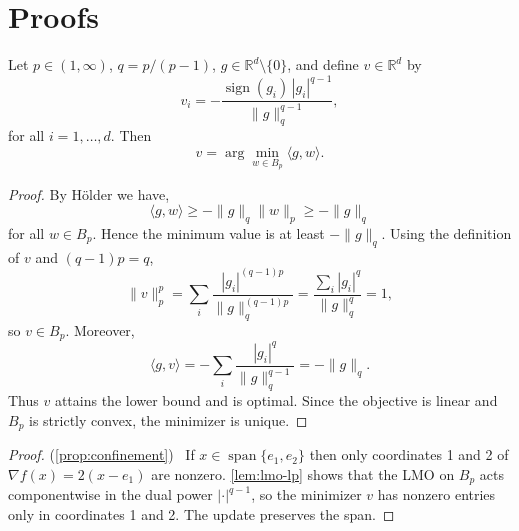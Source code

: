 \documentclass{article}
\newcommand{\R}{\mathbb{R}}
\DeclareMathOperator{\spann}{span}
\newcommand{\norm}[1]{\|#1\|}
\newcommand{\ip}[1]{\langle #1 \rangle}
\newcommand{\newtarget}[1]{\hypertarget{#1}{}}
\newcommand\linkofproof[1]{(\cref{#1})\newtarget{proof:#1}\ }
\begin{document}




\newpage
\appendix

\section{Proofs}\label{sec:proofs}

\begin{lemma}\label{lem:lmo-lp}
    Let $p\in(1,\infty)$, $q=p/(p-1)$, $g\in\R^d \setminus \{0\}$, and define
    $v\in\R^d$ by
    \[
        v_i = -\frac{\operatorname{sign}(g_i)\,|g_i|^{q-1}}{\norm{g}_q^{q-1}},
    \]
    for all $i=1,\dots,d$. Then
    \[
        v=\arg\min_{w\in B_p}\ip{g,w}.
    \]
\end{lemma}
\begin{proof}
    By Hölder we have,
    \[
      \ip{g,w}\ge -\norm{g}_q\norm{w}_p\ge -\norm{g}_q
    \]
    for all $w\in B_p$.
    Hence the minimum value is at least $-\norm{g}_q$. Using the definition of $v$
    and $(q-1)p=q$,
    \[
        \norm{v}_p^p
        =\sum_i \frac{|g_i|^{(q-1)p}}{\norm{g}_q^{(q-1)p}}
        =\frac{\sum_i |g_i|^q}{\norm{g}_q^q}
        =1,
    \]
    so $v\in B_p$. Moreover,
    \[
        \ip{g,v}
        =-\sum_i \frac{|g_i|^q}{\norm{g}_q^{q-1}}
        =-\norm{g}_q.
    \]
    Thus $v$ attains the lower bound and is optimal.
    Since the objective is linear and $B_p$ is strictly convex, the minimizer is unique.
\end{proof}

\confinementProposition*
\begin{proof}\linkofproof{prop:confinement}
    If $x\in\spann\{e_1,e_2\}$ then only coordinates 1 and 2 of $\nabla f(x)=2(x-e_1)$ are nonzero.
    \cref{lem:lmo-lp} shows that the LMO on $B_p$ acts componentwise in the dual power
    $|\cdot|^{q-1}$, so the minimizer $v$ has nonzero entries only in coordinates 1
    and 2. The update preserves the span.
\end{proof}
\end{document}
